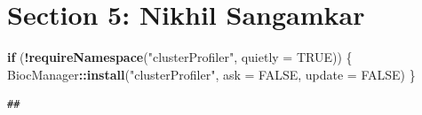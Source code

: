 \documentclass[
]{article}
\newenvironment{Shaded}{\begin{snugshade}}{\end{snugshade}}
\newcommand{\AttributeTok}[1]{\textcolor[rgb]{0.13,0.29,0.53}{#1}}
\newcommand{\ConstantTok}[1]{\textcolor[rgb]{0.56,0.35,0.01}{#1}}
\newcommand{\ControlFlowTok}[1]{\textcolor[rgb]{0.13,0.29,0.53}{\textbf{#1}}}
\newcommand{\FunctionTok}[1]{\textcolor[rgb]{0.13,0.29,0.53}{\textbf{#1}}}
\newcommand{\NormalTok}[1]{#1}
\newcommand{\SpecialCharTok}[1]{\textcolor[rgb]{0.81,0.36,0.00}{\textbf{#1}}}
\newcommand{\StringTok}[1]{\textcolor[rgb]{0.31,0.60,0.02}{#1}}
\begin{document}
\section{Section 5: Nikhil Sangamkar}\label{section-5-nikhil-sangamkar}

\begin{Shaded}
\begin{Highlighting}[]
\ControlFlowTok{if}\NormalTok{ (}\SpecialCharTok{!}\FunctionTok{requireNamespace}\NormalTok{(}\StringTok{"clusterProfiler"}\NormalTok{, }\AttributeTok{quietly =} \ConstantTok{TRUE}\NormalTok{)) \{}
\NormalTok{  BiocManager}\SpecialCharTok{::}\FunctionTok{install}\NormalTok{(}\StringTok{"clusterProfiler"}\NormalTok{, }\AttributeTok{ask =} \ConstantTok{FALSE}\NormalTok{, }\AttributeTok{update =} \ConstantTok{FALSE}\NormalTok{)}
\NormalTok{\}}
\end{Highlighting}
\end{Shaded}

\begin{verbatim}
## 
\end{verbatim}
\end{document}
